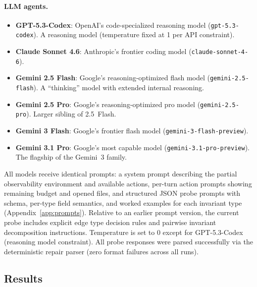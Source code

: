 \documentclass{article}
\begin{document}
\paragraph{LLM agents.}
\begin{itemize}[nosep]
    \item \textbf{GPT-5.3-Codex}: OpenAI's code-specialized reasoning model (\texttt{gpt-5.3-codex}). A reasoning model (temperature fixed at 1 per API constraint).
    \item \textbf{Claude Sonnet 4.6}: Anthropic's frontier coding model (\texttt{claude-sonnet-4-6}).
    \item \textbf{Gemini 2.5 Flash}: Google's reasoning-optimized flash model (\texttt{gemini-2.5-flash}). A ``thinking'' model with extended internal reasoning.
    \item \textbf{Gemini 2.5 Pro}: Google's reasoning-optimized pro model (\texttt{gemini-2.5-pro}). Larger sibling of 2.5~Flash.
    \item \textbf{Gemini 3 Flash}: Google's frontier flash model (\texttt{gemini-3-flash-preview}).
    \item \textbf{Gemini 3.1 Pro}: Google's most capable model (\texttt{gemini-3.1-pro-preview}). The flagship of the Gemini~3 family.
\end{itemize}
All models receive identical prompts: a system prompt describing the partial observability environment and available actions, per-turn action prompts showing remaining budget and opened files, and structured JSON probe prompts with schema, per-type field semantics, and worked examples for each invariant type (Appendix~\ref{app:prompts}). Relative to an earlier prompt version, the current probe includes explicit edge type decision rules and pairwise invariant decomposition instructions. Temperature is set to 0 except for GPT-5.3-Codex (reasoning model constraint). All probe responses were parsed successfully via the deterministic repair parser (zero format failures across all runs).

\subsection{Results}
\end{document}
